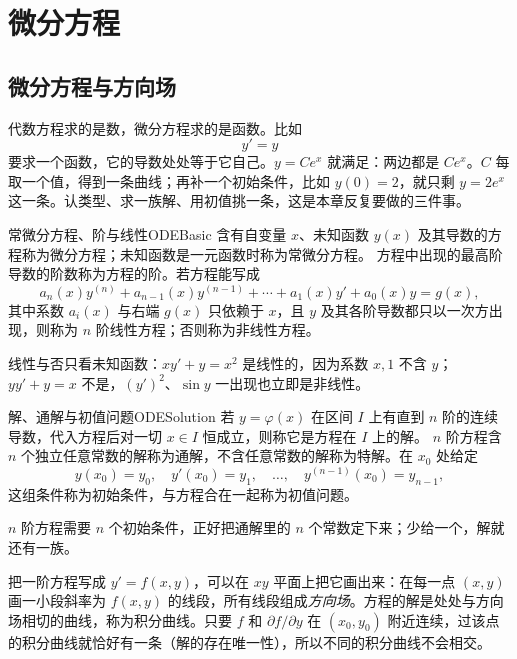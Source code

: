 \section{微分方程}

\subsection{微分方程与方向场}

代数方程求的是数，微分方程求的是函数。比如
\[
  y'=y
\]
要求一个函数，它的导数处处等于它自己。$y=Ce^x$ 就满足：两边都是 $Ce^x$。$C$ 每取一个值，得到一条曲线；再补一个初始条件，比如 $y(0)=2$，就只剩 $y=2e^x$ 这一条。认类型、求一族解、用初值挑一条，这是本章反复要做的三件事。

\begin{mydef}{常微分方程、阶与线性}{ODEBasic}
含有自变量 $x$、未知函数 $y(x)$ 及其导数的方程称为微分方程；未知函数是一元函数时称为常微分方程。
方程中出现的最高阶导数的阶数称为方程的阶。若方程能写成
\[
  a_n(x)y^{(n)}+a_{n-1}(x)y^{(n-1)}+\cdots+a_1(x)y'+a_0(x)y=g(x),
\]
其中系数 $a_i(x)$ 与右端 $g(x)$ 只依赖于 $x$，且 $y$ 及其各阶导数都只以一次方出现，则称为 $n$ 阶线性方程；否则称为非线性方程。
\end{mydef}

线性与否只看未知函数：$xy'+y=x^2$ 是线性的，因为系数 $x,1$ 不含 $y$；$yy'+y=x$ 不是，$(y')^2$、$\sin y$ 一出现也立即是非线性。

\begin{mydef}{解、通解与初值问题}{ODESolution}
若 $y=\varphi(x)$ 在区间 $I$ 上有直到 $n$ 阶的连续导数，代入方程后对一切 $x\in I$ 恒成立，则称它是方程在 $I$ 上的解。
$n$ 阶方程含 $n$ 个独立任意常数的解称为通解，不含任意常数的解称为特解。在 $x_0$ 处给定
\[
  y(x_0)=y_0,\quad y'(x_0)=y_1,\quad\ldots,\quad y^{(n-1)}(x_0)=y_{n-1},
\]
这组条件称为初始条件，与方程合在一起称为初值问题。
\end{mydef}

$n$ 阶方程需要 $n$ 个初始条件，正好把通解里的 $n$ 个常数定下来；少给一个，解就还有一族。

把一阶方程写成 $y'=f(x,y)$，可以在 $xy$ 平面上把它画出来：在每一点 $(x,y)$ 画一小段斜率为 $f(x,y)$ 的线段，所有线段组成\emph{方向场}。方程的解是处处与方向场相切的曲线，称为积分曲线。只要 $f$ 和 $\partial f/\partial y$ 在 $(x_0,y_0)$ 附近连续，过该点的积分曲线就恰好有一条（解的存在唯一性），所以不同的积分曲线不会相交。

